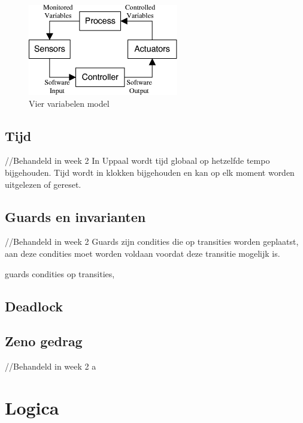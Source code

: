\documentclass{article}
\begin{document}
\begin{figure}[!h]
	\centering
	\includegraphics[width=\textwidth]{four_Variables}
    \caption{Vier variabelen model \cite{thompson2000requirements}}
	\label{fig:four_Variables}
\end{figure}

\subsection{Tijd}
//Behandeld in week 2 \newline
In Uppaal wordt tijd globaal op hetzelfde tempo bijgehouden. Tijd wordt in klokken bijgehouden en kan op elk moment worden uitgelezen of gereset. \cite{uppaalsmalltutorial}
\subsection{Guards en invarianten}
//Behandeld in week 2 \newline 
Guards zijn condities die op transities worden geplaatst, aan deze condities moet worden voldaan voordat deze transitie mogelijk is.\cite{uppaalsmalltutorial}


guards condities op transities, 

\subsection{Deadlock}

\subsection{Zeno gedrag}
//Behandeld in week 2
a\cite{leine2011zeno}
\section{Logica}
\end{document}
